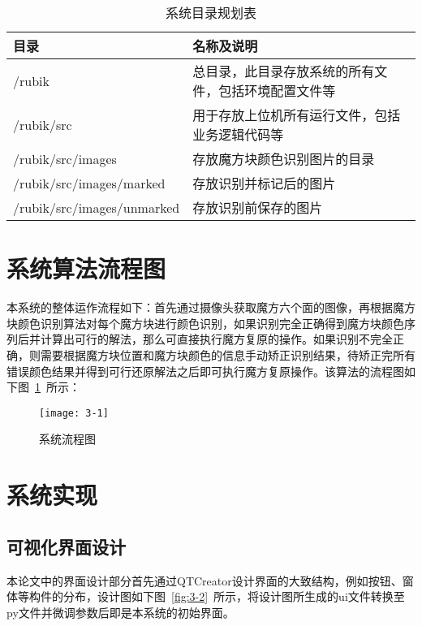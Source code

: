\begin{table}[H]
	\caption{系统目录规划表}\label{tab:3-1}
	\vspace{0.5em}
	\begin{center}
		{\wuhao
			\begin{tabular}{ll}
				\toprule
				目录 & 名称及说明	\\
				\midrule
				/rubik & 总目录，此目录存放系统的所有文件，包括环境配置文件等 \\
				/rubik/src & 用于存放上位机所有运行文件，包括业务逻辑代码等\\
				/rubik/src/images & 存放魔方块颜色识别图片的目录\\
				/rubik/src/images/marked & 存放识别并标记后的图片\\
				/rubik/src/images/unmarked & 存放识别前保存的图片\\
				\bottomrule
		\end{tabular}}
	\end{center}
	\vspace{-1.5em}
\end{table}

\section{系统算法流程图}

本系统的整体运作流程如下：首先通过摄像头获取魔方六个面的图像，再根据魔方块颜色识别算法对每个魔方块进行颜色识别，如果识别完全正确得到魔方块颜色序列后并计算出可行的解法，那么可直接执行魔方复原的操作。如果识别不完全正确，则需要根据魔方块位置和魔方块颜色的信息手动矫正识别结果，待矫正完所有错误颜色结果并得到可行还原解法之后即可执行魔方复原操作。该算法的流程图如下图~\ref{fig:3-1}~所示：

\begin{figure}[H]
	\centering
	\texttt{[image: 3-1]}
	\caption{系统流程图}\label{fig:3-1}
\end{figure}

\section{系统实现}

\subsection{可视化界面设计}

本论文中的界面设计部分首先通过QTCreator设计界面的大致结构，例如按钮、窗体等构件的分布，设计图如下图~\ref{fig:3-2}~所示，将设计图所生成的ui文件转换至py文件并微调参数后即是本系统的初始界面。

